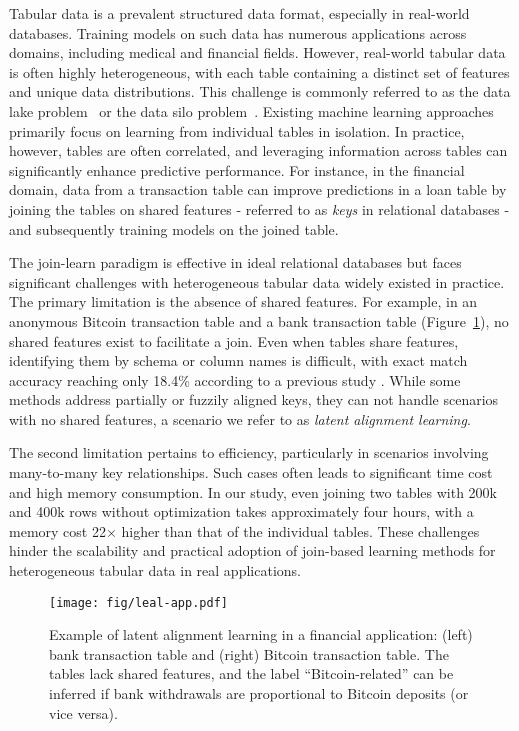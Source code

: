 Tabular data is a prevalent structured data format, especially in real-world databases. Training models on such data has numerous applications across domains, including medical and financial fields. However, real-world tabular data is often highly heterogeneous, with each table containing a distinct set of features and unique data distributions. This challenge is commonly referred to as the data lake problem~\cite{nargesian2019data} or the data silo problem~\cite{patel2019bridging}. Existing machine learning approaches~\cite{gorishniy2021revisiting, gorishniy2024tabm, chen2016xgboost, prokhorenkova2018catboost} primarily focus on learning from individual tables in isolation. In practice, however, tables are often correlated, and leveraging information across tables can significantly enhance predictive performance. For instance, in the financial domain, data from a transaction table can improve predictions in a loan table by joining the tables on shared features - referred to as \textit{keys} in relational databases - and subsequently training models on the joined table.


The join-learn paradigm is effective in ideal relational databases but faces significant challenges with heterogeneous tabular data widely existed in practice. The primary limitation is the absence of shared features. For example, in an anonymous Bitcoin transaction table and a bank transaction table (Figure~\ref{fig:app-example}), no shared features exist to facilitate a join. Even when tables share features, identifying them by schema or column names is difficult, with exact match accuracy reaching only 18.4\% according to a previous study \cite{vogel2024wikidbs}. While some methods address partially \cite{kang2022fedcvt, sun2023communication} or fuzzily \cite{wu2022coupled, wu2024federated} aligned keys, they can not handle scenarios with no shared features, a scenario we refer to as \textit{latent alignment learning}. 

The second limitation pertains to efficiency, particularly in scenarios involving many-to-many key relationships. Such cases often leads to significant time cost and high memory consumption. In our study, even joining two tables with 200k and 400k rows without optimization takes approximately four hours, with a memory cost 22$\times$ higher than that of the individual tables. These challenges hinder the scalability and practical adoption of join-based learning methods for heterogeneous tabular data in real applications.


\begin{figure}[t!]
    \centering
    \texttt{[image: fig/leal-app.pdf]}
    \caption{Example of latent alignment learning in a financial application: (left) bank transaction table and (right) Bitcoin transaction table. The tables lack shared features, and the label “Bitcoin-related” can be inferred if bank withdrawals are proportional to Bitcoin deposits (or vice versa).}
    \label{fig:app-example}
\end{figure}


